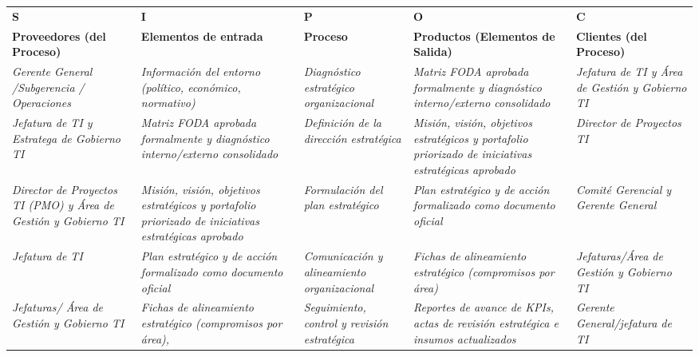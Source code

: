 \documentclass[11pt,letterpaper]{report}
\begin{document}
\begin{center}
  \small
  \begin{tabularx}{\textwidth}{>{\centering\arraybackslash}X >{\centering\arraybackslash}X >{\centering\arraybackslash}X >{\centering\arraybackslash}X >{\centering\arraybackslash}X}
  \toprule
  \textbf{S} & \textbf{I} & \textbf{P} & \textbf{O} & \textbf{C} \\
  \textbf{Proveedores (del Proceso)} & \textbf{Elementos de entrada} & \textbf{Proceso} & \textbf{Productos (Elementos de Salida)} & \textbf{Clientes (del Proceso)} \\
  \midrule
  \textit{Gerente General /Subgerencia / Operaciones} & \textit{Información del entorno (político, económico, normativo)} & \textit{Diagnóstico estratégico organizacional} & \textit{Matriz FODA aprobada formalmente y diagnóstico interno/externo consolidado} & \textit{Jefatura de TI y Área de Gestión y Gobierno TI} \\
  \midrule
  \textit{Jefatura de TI y Estratega de Gobierno TI} & \textit{Matriz FODA aprobada formalmente y diagnóstico interno/externo consolidado} & \textit{Definición de la dirección estratégica} & \textit{Misión, visión, objetivos estratégicos y portafolio priorizado de iniciativas estratégicas aprobado} & \textit{Director de Proyectos TI} \\
  \midrule
  \textit{Director de Proyectos TI (PMO) y Área de Gestión y Gobierno TI} & \textit{Misión, visión, objetivos estratégicos y portafolio priorizado de iniciativas estratégicas aprobado} & \textit{Formulación del plan estratégico} & \textit{Plan estratégico y de acción formalizado como documento oficial} & \textit{Comité Gerencial y Gerente General} \\
  \midrule
  \textit{Jefatura de TI} & \textit{Plan estratégico y de acción formalizado como documento oficial} & \textit{Comunicación y alineamiento organizacional} & \textit{Fichas de alineamiento estratégico (compromisos por área)} & \textit{Jefaturas/Área de Gestión y Gobierno TI} \\
  \midrule
  \textit{Jefaturas/ Área de Gestión y Gobierno TI} & \textit{Fichas de alineamiento estratégico (compromisos por área),} & \textit{Seguimiento, control y revisión estratégica} & \textit{Reportes de avance de KPIs, actas de revisión estratégica e insumos actualizados} & \textit{Gerente General/jefatura de TI} \\
  \bottomrule
  \end{tabularx}
\end{center}
\end{document}
